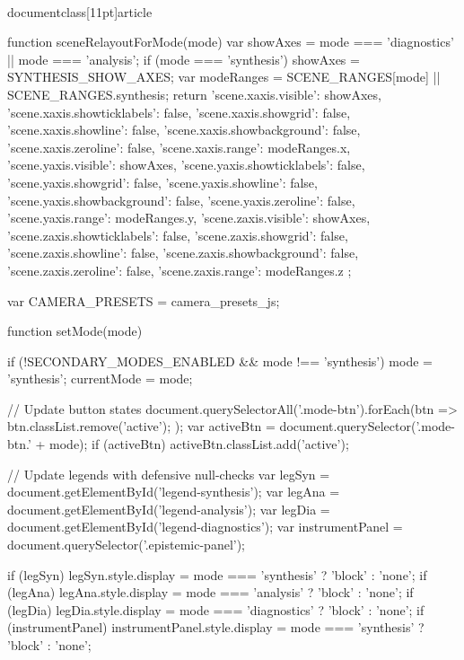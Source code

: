 \\documentclass[11pt]{article}
\begin{document}
\begin{CodeBlock}
{{{{{{        function sceneRelayoutForMode(mode) {{
            var showAxes = mode === 'diagnostics' || mode === 'analysis';
            if (mode === 'synthesis') {{
                showAxes = SYNTHESIS_SHOW_AXES;
            }}
            var modeRanges = SCENE_RANGES[mode] || SCENE_RANGES.synthesis;
            return {{
                'scene.xaxis.visible': showAxes,
                'scene.xaxis.showticklabels': false,
                'scene.xaxis.showgrid': false,
                'scene.xaxis.showline': false,
                'scene.xaxis.showbackground': false,
                'scene.xaxis.zeroline': false,
                'scene.xaxis.range': modeRanges.x,
                'scene.yaxis.visible': showAxes,
                'scene.yaxis.showticklabels': false,
                'scene.yaxis.showgrid': false,
                'scene.yaxis.showline': false,
                'scene.yaxis.showbackground': false,
                'scene.yaxis.zeroline': false,
                'scene.yaxis.range': modeRanges.y,
                'scene.zaxis.visible': showAxes,
                'scene.zaxis.showticklabels': false,
                'scene.zaxis.showgrid': false,
                'scene.zaxis.showline': false,
                'scene.zaxis.showbackground': false,
                'scene.zaxis.zeroline': false,
                'scene.zaxis.range': modeRanges.z
            }};
        }}

        var CAMERA_PRESETS = {camera_presets_js};

        function setMode(mode) {{
            if (!SECONDARY_MODES_ENABLED && mode !== 'synthesis') {{
                mode = 'synthesis';
            }}
            currentMode = mode;

            // Update button states
            document.querySelectorAll('.mode-btn').forEach(btn => {{
                btn.classList.remove('active');
            }});
            var activeBtn = document.querySelector('.mode-btn.' + mode);
            if (activeBtn) activeBtn.classList.add('active');

            // Update legends with defensive null-checks
            var legSyn = document.getElementById('legend-synthesis');
            var legAna = document.getElementById('legend-analysis');
            var legDia = document.getElementById('legend-diagnostics');
            var instrumentPanel = document.querySelector('.epistemic-panel');
            
            if (legSyn) legSyn.style.display = mode === 'synthesis' ? 'block' : 'none';
            if (legAna) legAna.style.display = mode === 'analysis' ? 'block' : 'none';
            if (legDia) legDia.style.display = mode === 'diagnostics' ? 'block' : 'none';
            if (instrumentPanel) instrumentPanel.style.display = mode === 'synthesis' ? 'block' : 'none';

}}}}}}}}
\end{CodeBlock}
\end{document}
